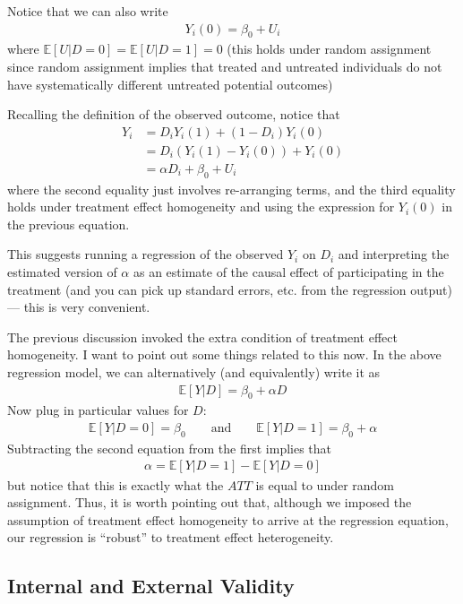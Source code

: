 \documentclass[
  letterpaper,
  DIV=11,
  numbers=noendperiod]{scrreprt}
\begin{document}
Notice that we can also write \begin{align*}
  Y_i(0) = \beta_0 + U_i
\end{align*} where \(\mathbb{E}[U|D=0] = \mathbb{E}[U|D=1] = 0\) (this
holds under random assignment since random assignment implies that
treated and untreated individuals do not have systematically different
untreated potential outcomes)

Recalling the definition of the observed outcome, notice that
\begin{align*}
  Y_i &= D_i Y_i(1) + (1-D_i) Y_i(0) \\
  &= D_i (Y_i(1) - Y_i(0)) + Y_i(0) \\
  &= \alpha D_i + \beta_0 + U_i
\end{align*} where the second equality just involves re-arranging terms,
and the third equality holds under treatment effect homogeneity and
using the expression for \(Y_i(0)\) in the previous equation.

This suggests running a regression of the observed \(Y_i\) on \(D_i\)
and interpreting the estimated version of \(\alpha\) as an estimate of
the causal effect of participating in the treatment (and you can pick up
standard errors, etc. from the regression output) --- this is very
convenient.

The previous discussion invoked the extra condition of treatment effect
homogeneity. I want to point out some things related to this now. In the
above regression model, we can alternatively (and equivalently) write it
as \begin{align*}
  \mathbb{E}[Y|D] = \beta_0 + \alpha D
\end{align*} Now plug in particular values for \(D\): \begin{align*}
  \mathbb{E}[Y|D=0] = \beta_0 \qquad \textrm{and} \qquad \mathbb{E}[Y|D=1] = \beta_0 + \alpha
\end{align*} Subtracting the second equation from the first implies that
\begin{align*}
  \alpha = \mathbb{E}[Y|D=1] - \mathbb{E}[Y|D=0]
\end{align*} but notice that this is exactly what the \(ATT\) is equal
to under random assignment. Thus, it is worth pointing out that,
although we imposed the assumption of treatment effect homogeneity to
arrive at the regression equation, our regression is ``robust'' to
treatment effect heterogeneity.

\subsection{Internal and External
Validity}\label{internal-and-external-validity}
\end{document}
